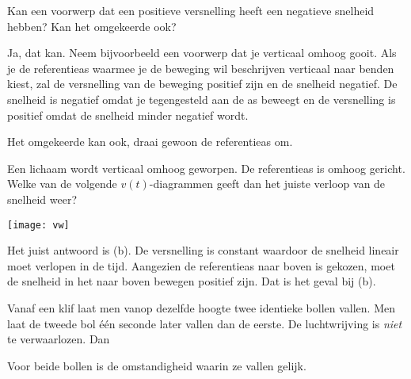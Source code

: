 \documentclass{ximera}
\begin{document}
\begin{exercise}
	Kan een voorwerp dat een positieve versnelling heeft een negatieve snelheid hebben? Kan het omgekeerde ook?%
	\begin{oplossing}
		Ja, dat kan. Neem bijvoorbeeld een voorwerp dat je verticaal omhoog gooit. Als je de referentieas waarmee je de beweging wil beschrijven verticaal naar benden kiest, zal de versnelling van de beweging positief zijn en de snelheid negatief. De snelheid is negatief omdat je tegengesteld aan de as beweegt en de versnelling is positief omdat de snelheid minder negatief wordt.

		Het omgekeerde kan ook, draai gewoon de referentieas om.
	\end{oplossing}
\end{exercise}

\begin{exercise}
	Een lichaam wordt verticaal omhoog geworpen. De referentieas is omhoog gericht. Welke van de volgende $v(t)$-diagrammen geeft dan het juiste verloop van de snelheid weer?
	\begin{image}[.92\textwidth]
		\texttt{[image: vw]}
	\end{image}
	\begin{oplossing}
		Het juist antwoord is (b). De versnelling is constant waardoor de snelheid lineair moet verlopen in de tijd. Aangezien de referentieas naar boven is gekozen, moet de snelheid in het naar boven bewegen positief zijn. Dat is het geval bij (b).
	\end{oplossing}
\end{exercise}

\begin{exercise}
	Vanaf een klif laat men vanop dezelfde hoogte twee identieke bollen vallen. Men laat de tweede bol \'e\'en seconde later vallen dan de eerste. De luchtwrijving is \textit{niet} te verwaarlozen. Dan
	\begin{multipleChoice}
	\end{multipleChoice}
	\begin{oplossing}
		Voor beide bollen is de omstandigheid waarin ze vallen gelijk.
	\end{oplossing}
\end{exercise}
\end{document}
